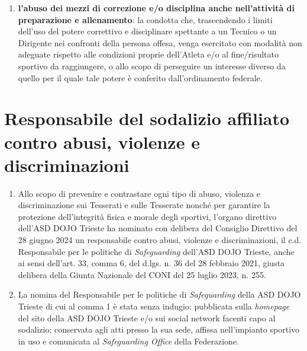 \documentclass{djtsasddoc}
\begin{document}
\begin{enumerate}
\begin{enumerate}
			\item \textbf{l'abuso dei mezzi di correzione e/o disciplina anche nell'attività di preparazione e allenamento}: la condotta che, trascendendo i limiti dell'uso del potere correttivo e disciplinare spettante a un Tecnico o un Dirigente nei confronti della persona offesa, venga esercitato con modalità non adeguate rispetto alle condizioni proprie dell'Atleta e/o al fine/risultato sportivo da raggiungere, o allo scopo di perseguire un interesse diverso da quello per il quale tale potere è conferito dall'ordinamento federale.
		\end{enumerate}
	\end{enumerate}
	
	\section{Responsabile del sodalizio affiliato contro abusi, violenze e discriminazioni}
	\begin{enumerate}
		\item Allo scopo di prevenire e contrastare ogni tipo di abuso, violenza e discriminazione sui Tesserati e sulle Tesserate nonché per garantire la protezione dell'integrità fisica e morale degli sportivi, l'organo direttivo dell'ASD DOJO Trieste ha nominato con delibera del Consiglio Direttivo del 28 giugno 2024 un responsabile contro abusi, violenze e discriminazioni, il c.d. Responsabile per le politiche di \textit{Safeguarding} dell'ASD DOJO Trieste, anche ai sensi dell'art. 33, comma 6, del d.lgs. n. 36 del 28 febbraio 2021, giusta delibera della Giunta Nazionale del CONI del 25 luglio 2023, n. 255.
		\item La nomina del Responsabile per le politiche di \textit{Safeguarding} della ASD DOJO Trieste di cui al comma 1 è stata senza indugio: pubblicata sulla \textit{homepage} del sito della ASD DOJO Trieste e/o sui social network facenti capo al sodalizio; conservata agli atti presso la sua sede, affissa nell'impianto sportivo in uso e comunicata al \textit{Safeguarding Office} della Federazione.
	\end{enumerate}
	
\end{document}
